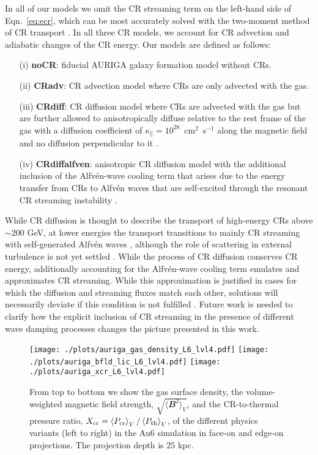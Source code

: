 \documentclass[useAMS,usenatbib]{mnras}
\newcommand{\bB}{\ensuremath{\mathbfit{B}}}
\begin{document}
In all of our models we omit the CR streaming term on the left-hand side of Eqn.~\eqref{eq:ecr}, which can be most accurately solved with the two-moment method of CR transport \citep{Jiang2018,Thomas2019}. In all three CR models, we account for CR advection and adiabatic changes of the CR energy. Our models are defined as follows:
\begin{itemize}
\item[(i)] \textbf{noCR}: fiducial AURIGA galaxy formation model without CRs.
\item[(ii)] \textbf{CRadv}: CR advection model where CRs are only advected with the gas.
\item[(iii)] \textbf{CRdiff}: CR diffusion model where CRs are advected with the gas but are further allowed to anisotropically diffuse relative to the rest frame of the gas with a diffusion coefficient of $\kappa_\parallel = 10^{28}$~cm$^2$~s$^{-1}$ along the magnetic field and no diffusion perpendicular to it \citep{Pakmor2016b}.
\item[(iv)] \textbf{CRdiffalfven}: anisotropic CR diffusion model with the additional inclusion of the Alfv\'en-wave cooling term that arises due to the energy transfer from CRs to Alfv\'en waves that are self-excited through the resonant CR streaming instability \citep{Kulsrud1969}.
\end{itemize}
While CR diffusion is thought to describe the transport of high-energy CRs above $\sim200$ GeV, at lower energies the transport transitions to mainly CR streaming with self-generated Alfv\'en waves \citep{Evoli2018}, although the role of scattering in external turbulence is not yet settled \citep{Zweibel2017}. While the process of CR diffusion conserves CR energy, additionally accounting for the Alfv\'en-wave cooling term emulates and approximates CR streaming. While this approximation is justified in cases for which the diffusion and streaming fluxes match each other, solutions will necessarily deviate if this condition is not fulfilled \citep{Wiener2017}. Future work is needed to clarify how the explicit inclusion of CR streaming in the presence of different wave damping processes changes the picture presented in this work.


\begin{figure*}
\vspace*{-.4cm}
\begin{center}
\raggedleft
\texttt{[image: ./plots/auriga\_gas\_density\_L6\_lvl4.pdf]}
\texttt{[image: ./plots/auriga\_bfld\_lic\_L6\_lvl4.pdf]}
\texttt{[image: ./plots/auriga\_xcr\_L6\_lvl4.pdf]}
\end{center}
\vspace{-.35cm}
\caption{From top to bottom we show the gas surface density, the volume-weighted magnetic field strength, $\sqrt{\langle\bB^2\rangle_V}$, and the CR-to-thermal pressure ratio, $X_{\rm cr} = \left<P_{\rm cr}\right>_V / \left<P_{\rm th}\right>_V$, of the different physics variants (left to right) in the Au6 simulation in face-on and edge-on projections. The projection depth is $25$ kpc.}
\label{fig:gas}
\end{figure*}
\end{document}
